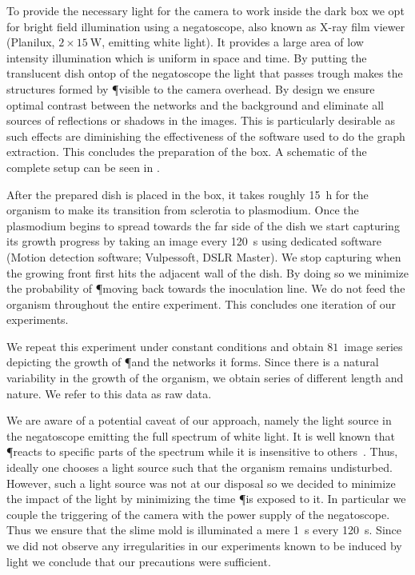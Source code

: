 		To provide the necessary light for the camera to work inside the dark box we opt for bright field illumination using a negatoscope, also known as X-ray film viewer (Planilux, $2 \times \SI{15}{\W}$, emitting white light). It provides a large area of low intensity illumination which is uniform in space and time. By putting the translucent dish ontop of the negatoscope the light that passes trough makes the structures formed by \P visible to the camera overhead. By design we ensure optimal contrast between the networks and the background and eliminate all sources of reflections or shadows in the images. This is particularly desirable as such effects are diminishing the effectiveness of the software used to do the graph extraction. This concludes the preparation of the box. A schematic of the complete setup can be seen in .

		After the prepared dish is placed in the box, it takes roughly \SI{15}{\hour} for the organism to make its transition from sclerotia to plasmodium. Once the plasmodium begins to spread towards the far side of the dish we start capturing its growth progress by taking an image every \SI{120}{\second} using dedicated software (Motion detection software; Vulpessoft, DSLR Master). We stop capturing when the growing front first hits the adjacent wall of the dish. By doing so we minimize the probability of \P moving back towards the inoculation line. We do not feed the organism throughout the entire experiment. This concludes one iteration of our experiments.

		We repeat this experiment under constant conditions and obtain $81$~image series depicting the growth of \P and the networks it forms. Since there is a natural variability in the growth of the organism, we obtain series of different length and nature. We refer to this data as raw data.

		We are aware of a potential caveat of our approach, namely the light source in the negatoscope emitting the full spectrum of white light. It is well known that \P reacts to specific parts of the spectrum while it is insensitive to others~\cite{nakagaki1996action}. Thus, ideally one chooses a light source such that the organism remains undisturbed. However, such a light source was not at our disposal so we decided to minimize the impact of the light by minimizing the time \P is exposed to it. In particular we couple the triggering of the camera with the power supply of the negatoscope. Thus we ensure that the slime mold is illuminated a mere \SI{1}{\second} every \SI{120}{\second}. Since we did not observe any irregularities in our experiments known to be induced by light we conclude that our precautions were sufficient.

